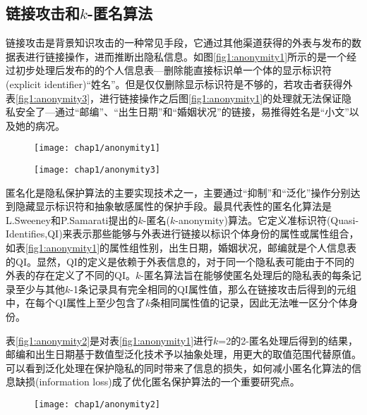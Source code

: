 \subsection{链接攻击和$k$-匿名算法}  %

链接攻击是背景知识攻击\supercite{compounding-attack}\supercite{background-attack}的一种常见手段，它通过其他渠道获得的外表与发布的数据表进行链接操作，进而推断出隐私信息。如图\ref{fig1:anonymity1}所示的是一个经过初步处理后发布的的个人信息表---删除能直接标识单一个体的显示标识符(explicit identifier)“姓名”。但是仅仅删除显示标识符是不够的，若攻击者获得外表\ref{fig1:anonymity3}，进行链接操作之后图\ref{fig1:anonymity1}的处理就无法保证隐私安全了---通过“邮编”、“出生日期”和“婚姻状况”的链接，易推得姓名是“小文”以及她的病况。

\begin{figure}[!htp]
	\centering
	\texttt{[image: chap1/anonymity1]}
\end{figure}

\begin{figure}[!htp]
	\centering
	\texttt{[image: chap1/anonymity3]}
\end{figure}


匿名化是隐私保护算法的主要实现技术之一，主要通过“抑制”和“泛化”操作分别达到隐藏显示标识符和抽象敏感属性的保护手段。最具代表性的匿名化算法是L.Sweeney和P.Samarati提出的$k$-匿名($k$-anonymity)\supercite{k-anonymity}算法。它定义准标识符(Quasi-Identifies,QI)来表示那些能够与外表进行链接以标识个体身份的属性或属性组合，如表\ref{fig1:anonymity1}的属性组{性别，出生日期，婚姻状况，邮编}就是个人信息表的QI。显然，QI的定义是依赖于外表信息的，对于同一个隐私表可能由于不同的外表的存在定义了不同的QI。$k$-匿名算法旨在能够使匿名处理后的隐私表的每条记录至少与其他$k$-1条记录具有完全相同的QI属性值，那么在链接攻击后得到的元组中，在每个QI属性上至少包含了$k$条相同属性值的记录，因此无法唯一区分个体身份。

表\ref{fig1:anonymity2}是对表\ref{fig1:anonymity1}进行$k$=2的2-匿名处理后得到的结果，邮编和出生日期基于数值型泛化技术予以抽象处理，用更大的取值范围代替原值。可以看到泛化处理在保护隐私的同时带来了信息的损失，如何减小匿名化算法的信息缺损(information loss)\supercite{bottom-up-generalization}\supercite{top-down-specialization}成了优化匿名保护算法的一个重要研究点。

\begin{figure}[!htp]
	\centering
	\texttt{[image: chap1/anonymity2]}
\end{figure}

